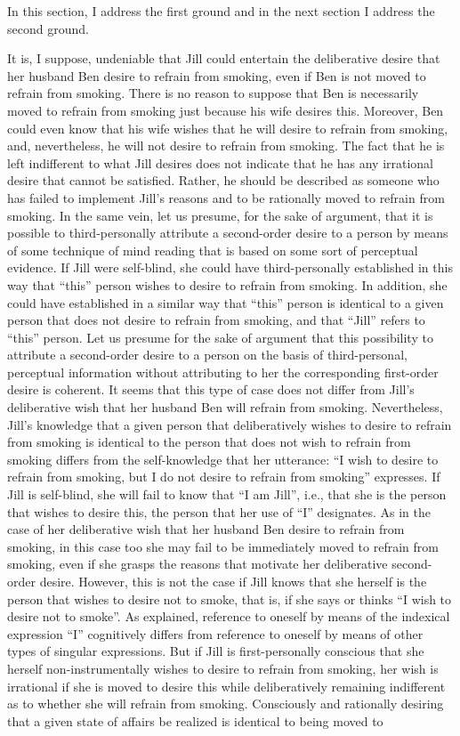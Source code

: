 \documentclass[output=paper,colorlinks,citecolor=brown
]{langscibook}
\begin{document}
In this section, I address the first ground and in the next section I address the second ground. 

It is, I suppose, undeniable that Jill could entertain the deliberative desire that her husband Ben desire to refrain from smoking, even if Ben is not moved to refrain from smoking. There is no reason to suppose that Ben is necessarily moved to refrain from smoking just because his wife desires this. Moreover, Ben could even know that his wife wishes that he will desire to refrain from smoking, and, nevertheless, he will not desire to refrain from smoking. The fact that he is left indifferent to what Jill desires does not indicate that he has any irrational desire that cannot be satisfied. Rather, he should be described as someone who has failed to implement Jill's reasons and to be rationally moved to refrain from smoking. In the same vein, let us presume, for the sake of argument, that it is possible to third-personally attribute a second-order desire to a person by means of some technique of mind reading that is based on some sort of perceptual evidence. If Jill were self-blind, she could have third-personally established in this way that “this” person wishes to desire to refrain from smoking. In addition, she could have established in a similar way that “this” person is identical to a given person that does not desire to refrain from smoking, and that “Jill” refers to “this” person. Let us presume for the sake of argument that this possibility to attribute a second-order desire to a person on the basis of third-personal, perceptual information without attributing to her the corresponding first-order desire is coherent. It seems that this type of case does not differ from Jill’s deliberative wish that her husband Ben will refrain from smoking. Nevertheless, Jill’s knowledge that a given person that deliberatively wishes to desire to refrain from smoking is identical to the person that does not wish to refrain from smoking differs from the self-knowledge that her utterance: “I wish to desire to refrain from smoking, but I do not desire to refrain from smoking” expresses. If Jill is self-blind, she will fail to know that “I am Jill”, i.e., that she is the person that wishes to desire this, the person that her use of “I” designates. As in the case of her deliberative wish that her husband Ben desire to refrain from smoking, in this case too she may fail to be immediately moved to refrain from smoking, even if she grasps the reasons that motivate her deliberative second-order desire. However, this is not the case if Jill knows that she herself is the person that wishes to desire not to smoke, that is, if  she says or thinks “I wish to desire not to smoke”. As \citet{perry1979problem} explained, reference to oneself by means of the indexical expression “I” cognitively differs from reference to oneself by means of other types of singular expressions.  But if Jill is first-personally conscious that she herself non-instrumentally wishes to desire to refrain from smoking, her wish is irrational if she is moved to desire this while deliberatively remaining indifferent as to whether she will refrain from smoking. Consciously and rationally desiring that a given state of affairs be realized is identical to being moved to 
\end{document}
